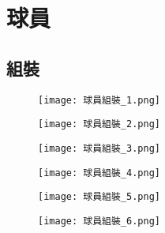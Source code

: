 \chapter{球員}
\section{組裝}
\begin{figure}[hbt!]
  \begin{center}
    \texttt{[image: 球員組裝\_1.png]}
  \end{center}
  \caption[導入球員STL檔]{}
  \label{fig:photo}
\end{figure}

\begin{figure}[hbt!]
  \begin{center}
    \texttt{[image: 球員組裝\_2.png]}
  \end{center}
  \caption[爆炸分解]{}
  \label{fig:photo}
\end{figure}

\begin{figure}[hbt!]
  \begin{center}
    \texttt{[image: 球員組裝\_3.png]}
  \end{center}
  \caption[更改顏色]{}
  \label{fig:photo}
\end{figure}

\begin{figure}[hbt!]
  \begin{center}
    \texttt{[image: 球員組裝\_4.png]}
  \end{center}
  \caption[更改物件名稱]{}
  \label{fig:photo}
\end{figure}

\begin{figure}[hbt!]
  \begin{center}
    \texttt{[image: 球員組裝\_5.png]}
  \end{center}
  \caption[新增Joint]{}
  \label{fig:photo}
\end{figure}

\begin{figure}[hbt!]
  \begin{center}
    \texttt{[image: 球員組裝\_6.png]}
  \end{center}
  \caption[調整Joint大小]{}
  \label{fig:photo}
\end{figure}

